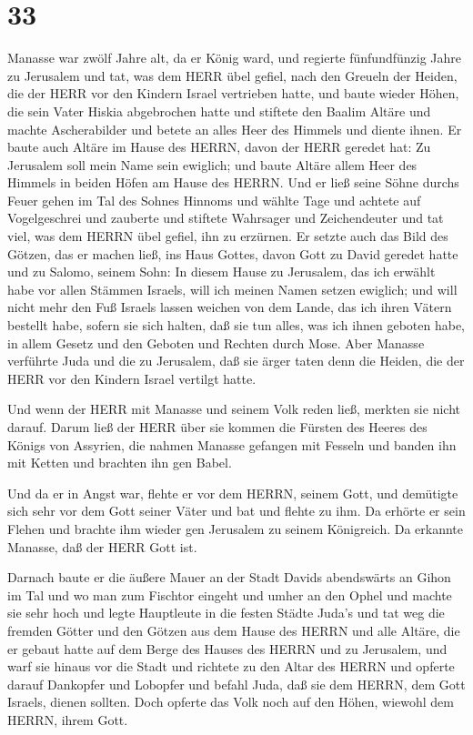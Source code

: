 \hypertarget{section-32}{%
\section{33}\label{section-32}}

 Manasse war zwölf Jahre alt, da er König ward, und regierte
fünfundfünzig Jahre zu Jerusalem  und tat, was dem HERR übel
gefiel, nach den Greueln der Heiden, die der HERR vor den Kindern Israel
vertrieben hatte,  und baute wieder Höhen, die sein Vater
Hiskia abgebrochen hatte und stiftete den Baalim Altäre und machte
Ascherabilder und betete an alles Heer des Himmels und diente ihnen.
 Er baute auch Altäre im Hause des HERRN, davon der HERR
geredet hat: Zu Jerusalem soll mein Name sein ewiglich;  und
baute Altäre allem Heer des Himmels in beiden Höfen am Hause des HERRN.
 Und er ließ seine Söhne durchs Feuer gehen im Tal des
Sohnes Hinnoms und wählte Tage und achtete auf Vogelgeschrei und
zauberte und stiftete Wahrsager und Zeichendeuter und tat viel, was dem
HERRN übel gefiel, ihn zu erzürnen.  Er setzte auch das Bild
des Götzen, das er machen ließ, ins Haus Gottes, davon Gott zu David
geredet hatte und zu Salomo, seinem Sohn: In diesem Hause zu Jerusalem,
das ich erwählt habe vor allen Stämmen Israels, will ich meinen Namen
setzen ewiglich;  und will nicht mehr den Fuß Israels lassen
weichen von dem Lande, das ich ihren Vätern bestellt habe, sofern sie
sich halten, daß sie tun alles, was ich ihnen geboten habe, in allem
Gesetz und den Geboten und Rechten durch Mose.  Aber Manasse
verführte Juda und die zu Jerusalem, daß sie ärger taten denn die
Heiden, die der HERR vor den Kindern Israel vertilgt hatte.

 Und wenn der HERR mit Manasse und seinem Volk reden ließ,
merkten sie nicht darauf.  Darum ließ der HERR über sie
kommen die Fürsten des Heeres des Königs von Assyrien, die nahmen
Manasse gefangen mit Fesseln und banden ihn mit Ketten und brachten ihn
gen Babel.

 Und da er in Angst war, flehte er vor dem HERRN, seinem
Gott, und demütigte sich sehr vor dem Gott seiner Väter 
und bat und flehte zu ihm. Da erhörte er sein Flehen und brachte ihm
wieder gen Jerusalem zu seinem Königreich. Da erkannte Manasse, daß der
HERR Gott ist.

 Darnach baute er die äußere Mauer an der Stadt Davids
abendswärts an Gihon im Tal und wo man zum Fischtor eingeht und umher an
den Ophel und machte sie sehr hoch und legte Hauptleute in die festen
Städte Juda's  und tat weg die fremden Götter und den
Götzen aus dem Hause des HERRN und alle Altäre, die er gebaut hatte auf
dem Berge des Hauses des HERRN und zu Jerusalem, und warf sie hinaus vor
die Stadt  und richtete zu den Altar des HERRN und opferte
darauf Dankopfer und Lobopfer und befahl Juda, daß sie dem HERRN, dem
Gott Israels, dienen sollten.  Doch opferte das Volk noch
auf den Höhen, wiewohl dem HERRN, ihrem Gott.

